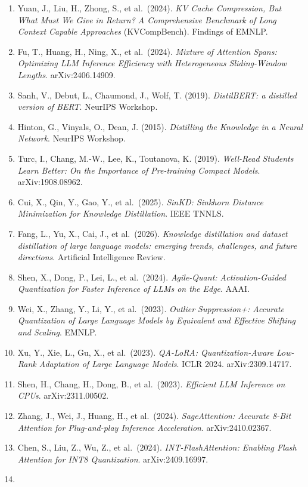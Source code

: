 \begin{enumerate}
\item
  Yuan, J., Liu, H., Zhong, S., et al.~(2024). \emph{KV Cache Compression, But What Must We Give in Return? A Comprehensive Benchmark of Long Context Capable Approaches} (KVCompBench). Findings of EMNLP.
\item
  Fu, T., Huang, H., Ning, X., et al.~(2024). \emph{Mixture of Attention Spans: Optimizing LLM Inference Efficiency with Heterogeneous Sliding-Window Lengths}. arXiv:2406.14909.
\item
  Sanh, V., Debut, L., Chaumond, J., Wolf, T. (2019). \emph{DistilBERT: a distilled version of BERT}. NeurIPS Workshop.
\item
  Hinton, G., Vinyals, O., Dean, J. (2015). \emph{Distilling the Knowledge in a Neural Network}. NeurIPS Workshop.
\item
  Turc, I., Chang, M.-W., Lee, K., Toutanova, K. (2019). \emph{Well-Read Students Learn Better: On the Importance of Pre-training Compact Models}. arXiv:1908.08962.
\item
  Cui, X., Qin, Y., Gao, Y., et al.~(2025). \emph{SinKD: Sinkhorn Distance Minimization for Knowledge Distillation}. IEEE TNNLS.
\item
  Fang, L., Yu, X., Cai, J., et al.~(2026). \emph{Knowledge distillation and dataset distillation of large language models: emerging trends, challenges, and future directions}. Artificial Intelligence Review.
\item
  Shen, X., Dong, P., Lei, L., et al.~(2024). \emph{Agile-Quant: Activation-Guided Quantization for Faster Inference of LLMs on the Edge}. AAAI.
\item
  Wei, X., Zhang, Y., Li, Y., et al.~(2023). \emph{Outlier Suppression+: Accurate Quantization of Large Language Models by Equivalent and Effective Shifting and Scaling}. EMNLP.
\item
  Xu, Y., Xie, L., Gu, X., et al.~(2023). \emph{QA-LoRA: Quantization-Aware Low-Rank Adaptation of Large Language Models}. ICLR 2024. arXiv:2309.14717.
\item
  Shen, H., Chang, H., Dong, B., et al.~(2023). \emph{Efficient LLM Inference on CPUs}. arXiv:2311.00502.
\item
  Zhang, J., Wei, J., Huang, H., et al.~(2024). \emph{SageAttention: Accurate 8-Bit Attention for Plug-and-play Inference Acceleration}. arXiv:2410.02367.
\item
  Chen, S., Liu, Z., Wu, Z., et al.~(2024). \emph{INT-FlashAttention: Enabling Flash Attention for INT8 Quantization}. arXiv:2409.16997.
\item

\end{enumerate}
